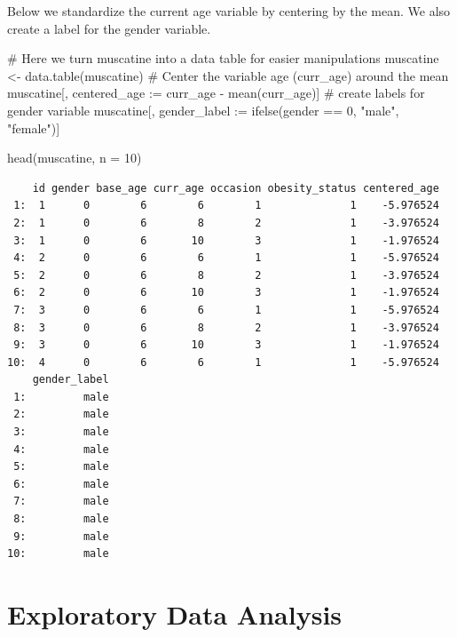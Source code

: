 \documentclass[
  letterpaper,
  DIV=11,
  numbers=noendperiod]{scrreprt}
\newenvironment{Shaded}{\begin{snugshade}}{\end{snugshade}}
\newcommand{\AttributeTok}[1]{\textcolor[rgb]{0.40,0.45,0.13}{#1}}
\newcommand{\CommentTok}[1]{\textcolor[rgb]{0.37,0.37,0.37}{#1}}
\newcommand{\DecValTok}[1]{\textcolor[rgb]{0.68,0.00,0.00}{#1}}
\newcommand{\ErrorTok}[1]{\textcolor[rgb]{0.68,0.00,0.00}{#1}}
\newcommand{\FunctionTok}[1]{\textcolor[rgb]{0.28,0.35,0.67}{#1}}
\newcommand{\NormalTok}[1]{\textcolor[rgb]{0.00,0.23,0.31}{#1}}
\newcommand{\OtherTok}[1]{\textcolor[rgb]{0.00,0.23,0.31}{#1}}
\newcommand{\SpecialCharTok}[1]{\textcolor[rgb]{0.37,0.37,0.37}{#1}}
\newcommand{\StringTok}[1]{\textcolor[rgb]{0.13,0.47,0.30}{#1}}
\begin{document}
Below we standardize the current age variable by centering by the mean.
We also create a label for the gender variable.

\begin{Shaded}
\begin{Highlighting}[]
\CommentTok{\# Here we turn muscatine into a data table for easier manipulations}
\NormalTok{muscatine }\OtherTok{\textless{}{-}} \FunctionTok{data.table}\NormalTok{(muscatine)}
\CommentTok{\# Center the variable age (curr\_age) around the mean}
\NormalTok{muscatine[, centered\_age }\SpecialCharTok{:}\ErrorTok{=}\NormalTok{ curr\_age }\SpecialCharTok{{-}} \FunctionTok{mean}\NormalTok{(curr\_age)]}
\CommentTok{\# create labels for gender variable}
\NormalTok{muscatine[, gender\_label }\SpecialCharTok{:}\ErrorTok{=} \FunctionTok{ifelse}\NormalTok{(gender }\SpecialCharTok{==} \DecValTok{0}\NormalTok{, }\StringTok{"male"}\NormalTok{, }\StringTok{"female"}\NormalTok{)]}

\FunctionTok{head}\NormalTok{(muscatine, }\AttributeTok{n =} \DecValTok{10}\NormalTok{)}
\end{Highlighting}
\end{Shaded}

\begin{verbatim}
    id gender base_age curr_age occasion obesity_status centered_age
 1:  1      0        6        6        1              1    -5.976524
 2:  1      0        6        8        2              1    -3.976524
 3:  1      0        6       10        3              1    -1.976524
 4:  2      0        6        6        1              1    -5.976524
 5:  2      0        6        8        2              1    -3.976524
 6:  2      0        6       10        3              1    -1.976524
 7:  3      0        6        6        1              1    -5.976524
 8:  3      0        6        8        2              1    -3.976524
 9:  3      0        6       10        3              1    -1.976524
10:  4      0        6        6        1              1    -5.976524
    gender_label
 1:         male
 2:         male
 3:         male
 4:         male
 5:         male
 6:         male
 7:         male
 8:         male
 9:         male
10:         male
\end{verbatim}

\hypertarget{exploratory-data-analysis}{%
\section{Exploratory Data Analysis}\label{exploratory-data-analysis}}
\end{document}

